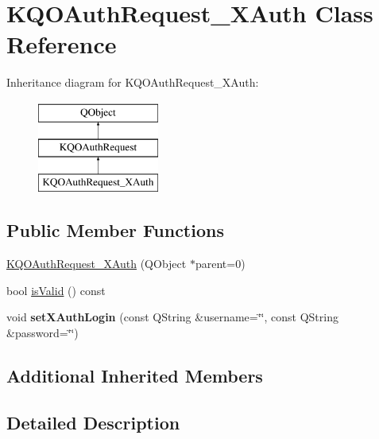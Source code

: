 \hypertarget{class_k_q_o_auth_request___x_auth}{}\section{K\+Q\+O\+Auth\+Request\+\_\+\+X\+Auth Class Reference}
\label{class_k_q_o_auth_request___x_auth}
Inheritance diagram for K\+Q\+O\+Auth\+Request\+\_\+\+X\+Auth\+:\begin{figure}[H]
\begin{center}
\leavevmode
\includegraphics[height=3.000000cm]{class_k_q_o_auth_request___x_auth}
\end{center}
\end{figure}
\subsection*{Public Member Functions}
\begin{DoxyCompactItemize}
\item 
\hyperlink{class_k_q_o_auth_request___x_auth_a5b96dc9b8845f7830c9108080034b440}{K\+Q\+O\+Auth\+Request\+\_\+\+X\+Auth} (Q\+Object $\ast$parent=0)
\item 
bool \hyperlink{class_k_q_o_auth_request___x_auth_a16c33c7beb070b6af0e8b126330b239e}{is\+Valid} () const
\item 
\mbox{\label{class_k_q_o_auth_request___x_auth_a6e3d91a097b8ff59cfde56181a1bd4ed}} 
void {\bfseries set\+X\+Auth\+Login} (const Q\+String \&username=\char`\"{}\char`\"{}, const Q\+String \&password=\char`\"{}\char`\"{})
\end{DoxyCompactItemize}
\subsection*{Additional Inherited Members}


\subsection{Detailed Description}


